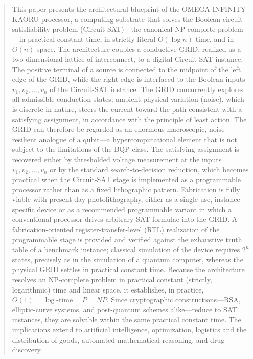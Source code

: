 \documentclass[letterpaper,journal]{IEEEtran}
\begin{document}
\begin{abstract}
This paper presents the architectural blueprint of the OMEGA INFINITY KAORU
processor, a computing substrate that solves the Boolean circuit
satisfiability problem (Circuit-SAT)---the canonical NP-complete
problem---in practical constant time, in strictly literal $O(\log n)$ time,
and in $O(n)$ space. The architecture couples a conductive GRID, realized as
a two-dimensional lattice of interconnect, to a digital Circuit-SAT
instance. The positive terminal of a source is connected to the midpoint of
the left edge of the GRID, while the right edge is interfaced to the Boolean
inputs $v_1, v_2, \dots, v_n$ of the Circuit-SAT instance. The GRID
concurrently explores all admissible conduction states; ambient physical
variation (noise), which is discrete in nature, steers the current toward
the path consistent with a satisfying assignment, in accordance with the
principle of least action. The GRID can therefore be regarded as an enormous
macroscopic, noise-resilient analogue of a qubit---a hypercomputational
element that is not subject to the limitations of the BQP class. The
satisfying assignment is recovered either by thresholded voltage measurement
at the inputs $v_1, v_2, \dots, v_n$ or by the standard search-to-decision
reduction, which becomes practical when the Circuit-SAT stage is implemented
as a programmable processor rather than as a fixed lithographic pattern.
Fabrication is fully viable with present-day photolithography, either as a
single-use, instance-specific device or as a recommended programmable
variant in which a conventional processor drives arbitrary SAT formulae into
the GRID. A fabrication-oriented register-transfer-level (RTL) realization
of the programmable stage is provided and verified against the exhaustive
truth table of a benchmark instance; classical simulation of the device
requires $2^{n}$ states, precisely as in the simulation of a quantum
computer, whereas the physical GRID settles in practical constant time.
Because the architecture resolves an NP-complete problem in practical
constant (strictly, logarithmic) time and linear space, it establishes, in
practice, $O(1)=\log\text{-time}=P=NP$. Since cryptographic
constructions---RSA, elliptic-curve systems, and post-quantum schemes
alike---reduce to SAT instances, they are solvable within the same practical
constant time. The implications extend to artificial intelligence,
optimization, logistics and the distribution of goods, automated
mathematical reasoning, and drug discovery.
\end{abstract}
\end{document}
